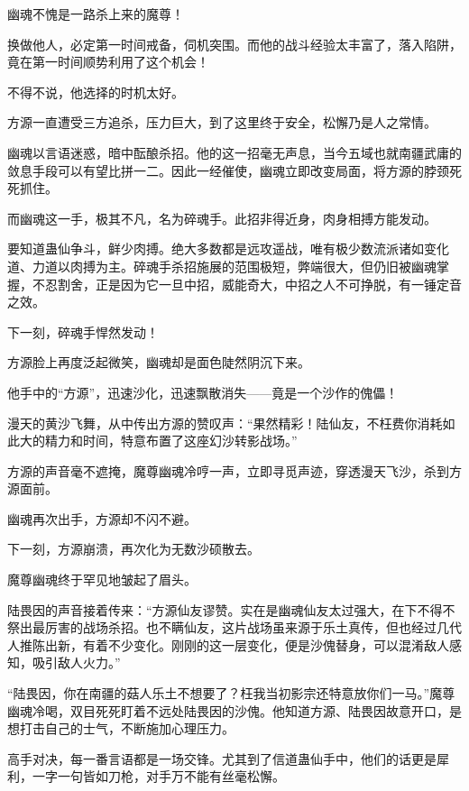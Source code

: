 
\begin{this_body}

幽魂不愧是一路杀上来的魔尊！

换做他人，必定第一时间戒备，伺机突围。而他的战斗经验太丰富了，落入陷阱，竟在第一时间顺势利用了这个机会！

不得不说，他选择的时机太好。

方源一直遭受三方追杀，压力巨大，到了这里终于安全，松懈乃是人之常情。

幽魂以言语迷惑，暗中酝酿杀招。他的这一招毫无声息，当今五域也就南疆武庸的敛息手段可以有望比拼一二。因此一经催使，幽魂立即改变局面，将方源的脖颈死死抓住。

而幽魂这一手，极其不凡，名为碎魂手。此招非得近身，肉身相搏方能发动。

要知道蛊仙争斗，鲜少肉搏。绝大多数都是远攻遥战，唯有极少数流派诸如变化道、力道以肉搏为主。碎魂手杀招施展的范围极短，弊端很大，但仍旧被幽魂掌握，不忍割舍，正是因为它一旦中招，威能奇大，中招之人不可挣脱，有一锤定音之效。

下一刻，碎魂手悍然发动！

方源脸上再度泛起微笑，幽魂却是面色陡然阴沉下来。

他手中的“方源”，迅速沙化，迅速飘散消失——竟是一个沙作的傀儡！

漫天的黄沙飞舞，从中传出方源的赞叹声：“果然精彩！陆仙友，不枉费你消耗如此大的精力和时间，特意布置了这座幻沙转影战场。”

方源的声音毫不遮掩，魔尊幽魂冷哼一声，立即寻觅声迹，穿透漫天飞沙，杀到方源面前。

幽魂再次出手，方源却不闪不避。

下一刻，方源崩溃，再次化为无数沙硕散去。

魔尊幽魂终于罕见地皱起了眉头。

陆畏因的声音接着传来：“方源仙友谬赞。实在是幽魂仙友太过强大，在下不得不祭出最厉害的战场杀招。也不瞒仙友，这片战场虽来源于乐土真传，但也经过几代人推陈出新，有着不少变化。刚刚的这一层变化，便是沙傀替身，可以混淆敌人感知，吸引敌人火力。”

“陆畏因，你在南疆的菇人乐土不想要了？枉我当初影宗还特意放你们一马。”魔尊幽魂冷喝，双目死死盯着不远处陆畏因的沙傀。他知道方源、陆畏因故意开口，是想打击自己的士气，不断施加心理压力。

高手对决，每一番言语都是一场交锋。尤其到了信道蛊仙手中，他们的话更是犀利，一字一句皆如刀枪，对手万不能有丝毫松懈。


\end{this_body}
